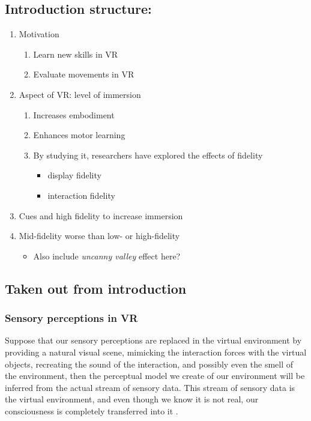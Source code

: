\subsection{Introduction structure:}
\begin{enumerate}
    \item Motivation
    \begin{enumerate}
        \item Learn new skills in VR
        \item Evaluate movements in VR
    \end{enumerate}
    \item Aspect of VR: level of immersion
    \begin{enumerate}
        \item Increases embodiment
        \item Enhances motor learning 
        \item By studying it, researchers have explored the effects of fidelity
        \begin{itemize}
            \item display fidelity
            \item interaction fidelity
        \end{itemize}
    \end{enumerate} 
    \item Cues and high fidelity to increase immersion
    \item Mid-fidelity worse than low- or high-fidelity
    \begin{itemize}
        \item Also include \textit{uncanny valley} effect here?
    \end{itemize}
\end{enumerate}
\vspace{5mm}


\subsection{Taken out from introduction}
\subsubsection{Sensory perceptions in VR}
Suppose that our sensory perceptions are replaced in the virtual environment by providing a natural visual scene, mimicking the interaction forces with the virtual objects, recreating the sound of the interaction, and possibly even the smell of the environment, then the perceptual model we create of our environment will be inferred from the actual stream of sensory data. This stream of sensory data is the virtual environment, and even though we know it is not real, our consciousness is completely transferred into it \cite{Slater2016EnhancingReality}. 

